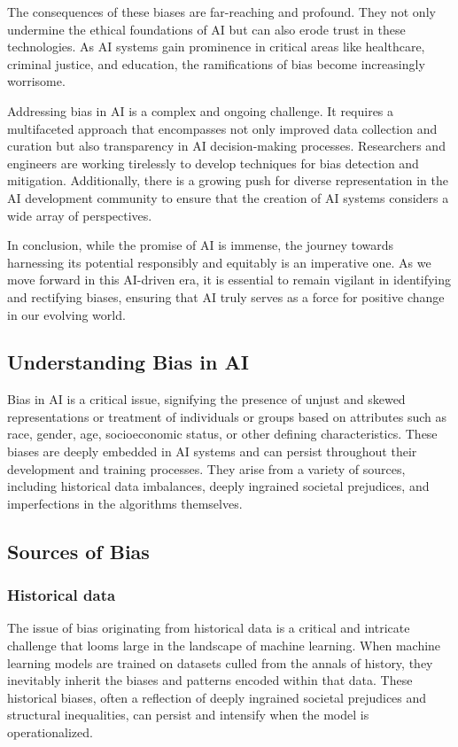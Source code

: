 \documentclass[12pt,a4paper,openright,twoside]{book}
\begin{document}
The consequences of these biases are far-reaching and profound. They not only undermine the ethical foundations of AI but can also erode trust in these technologies. As AI systems gain prominence in critical areas like healthcare, criminal justice, and education, the ramifications of bias become increasingly worrisome. 

Addressing bias in AI is a complex and ongoing challenge. It requires a multifaceted approach that encompasses not only improved data collection and curation but also transparency in AI decision-making processes. Researchers and engineers are working tirelessly to develop techniques for bias detection and mitigation. Additionally, there is a growing push for diverse representation in the AI development community to ensure that the creation of AI systems considers a wide array of perspectives. 

In conclusion, while the promise of AI is immense, the journey towards harnessing its potential responsibly and equitably is an imperative one. As we move forward in this AI-driven era, it is essential to remain vigilant in identifying and rectifying biases, ensuring that AI truly serves as a force for positive change in our evolving world. \cite{10.1145/3308560.3317590}

\subsection{Understanding Bias in AI}

Bias in AI is a critical issue, signifying the presence of unjust and skewed representations or treatment of individuals or groups based on attributes such as race, gender, age, socioeconomic status, or other defining characteristics. These biases are deeply embedded in AI systems and can persist throughout their development and training processes. They arise from a variety of sources, including historical data imbalances, deeply ingrained societal prejudices, and imperfections in the algorithms themselves.

\subsection{Sources of Bias}

\subsubsection{Historical data} 

The issue of bias originating from historical data is a critical and intricate challenge that looms large in the landscape of machine learning. When machine learning models are trained on datasets culled from the annals of history, they inevitably inherit the biases and patterns encoded within that data. These historical biases, often a reflection of deeply ingrained societal prejudices and structural inequalities, can persist and intensify when the model is operationalized. \cite{10.1145/3308560.3317590}
\end{document}
